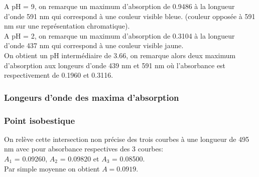 \documentclass{scrartcl}
\begin{document}

				\one
				\two
				\three

			
				A pH = 9, on remarque un maximum d'absorption de 0.9486 à la longueur d'onde 591 nm qui correspond à une couleur visible bleue. (couleur opposée à 591 nm sur une représentation chromatique).\\
				A pH = 2, on remarque un maximum d'absorption de 0.3104 à la longueur d'onde 437 nm qui correspond à une couleur visible jaune.\\
				On obtient un pH intermédiaire de 3.66, on remarque alors deux maximum d'absorption aux longeurs d'onde 439 nm et 591 nm où l'absorbance est respectivement de 0.1960 et 0.3116.
			
			\subsubsection{Longeurs d'onde des maxima d'absorption}
			

			
			\subsubsection{Point isobestique}
			
				On relève cette intersection non précise des trois courbes à une longueur de 495 nm avec pour absorbance respectives des 3 courbes:\\
				$A_1$ = 0.09260, $A_2$ = 0.09820 et $A_3$ = 0.08500.\\
				Par simple moyenne on obtient $A = 0.0919$.
			
\end{document}
